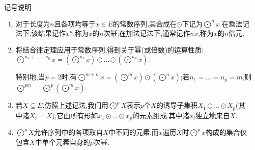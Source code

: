 \begin{remark}{记号说明}{}
	\begin{enumerate}
		\item 对于长度为$n$且各项均等于$x\in E$的常数序列,其合成在$\odot$下记为$\bigodot\limits^{n}x$.在乘法记法下,该结果记作$x^{n}$,称为$x$的$n$次幂;在加法记法下,通常记作$nx$,称为$x$的$n$倍元.
		\item 将结合律定理应用于常数序列,得到关于幂(或倍数)的运算性质:$\bigodot\limits^{n_{1}+\ldots+n_{p}}x=\left(\bigodot\limits^{n_{1}}x\right)\odot\ldots\odot\left(\bigodot\limits^{n_{p}}x\right)$.
		
		特别地,当$p=2$时,有$\bigodot\limits^{m+n}x=\left(\bigodot\limits^{m}x\right)\odot\left(\bigodot\limits^{n}x\right)$;若$n_{1}=\ldots=n_{p}=m$,则$\bigodot\limits^{pm}=\bigodot\limits^{p}\left(\bigodot\limits^{m}x\right)$.
		\item 若$X\subseteq E$,仿照上述记法,我们用$\bigodot\limits^{p}X$表示$p$个$X$的诱导子集积$X_{1}\odot\ldots\odot X_{p}$(其中诸$X_{i}=X$),它由所有形如$x_{1}\odot\ldots\odot x_{p}$的元素组成,其中诸$x_{i}$独立地来自$X$. 
		\item $\bigodot\limits^{p}X$允许序列中的各项取自$X$中不同的元素,而$x$遍历$X$时$\bigodot\limits^{p}x$构成的集合仅包含$X$中单个元素自身的$p$次幂.
	\end{enumerate}
\end{remark}